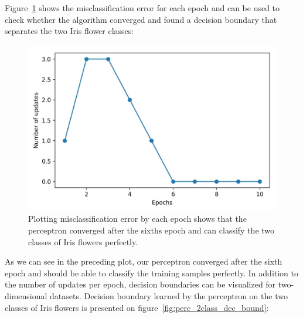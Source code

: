 \documentclass[11pt]{article}
\begin{document}
    Figure~\ref{fig:perc_updates_epochs} shows the misclassification error for each epoch and can be used to check whether the algorithm converged and found a decision boundary that separates the two Iris flower classes:

    \begin{figure}[hbt!]
        \centering
        \includegraphics[width=1\linewidth,trim=4 4 4 4,clip]{img/perc_updates_epochs.png}
        \caption{Plotting misclassification error by each epoch shows that the perceptron converged after the sixths epoch and can classify the two classes of Iris flowers perfectly.}
        \label{fig:perc_updates_epochs}
    \end{figure}

    As we can see in the preceding plot, our perceptron converged after the sixth epoch and should be able to classify the training samples perfectly.
    In addition to the number of updates per epoch, decision boundaries can be visualized for two-dimensional datasets.
    Decision boundary learned by the perceptron on the two classes of Iris flowers is presented on figure~\ref{fig:perc_2class_dec_bound}:
\end{document}
